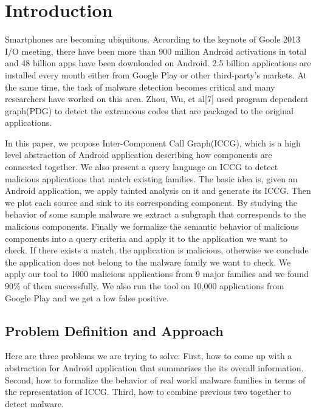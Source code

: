 \documentclass{sig-alternate}
\begin{document}
\section{Introduction}
Smartphones are becoming ubiquitous. According to the keynote of Goole 2013 I/O meeting, there have been more than 900 million Android activations in total and 48 billion apps have been downloaded on Android. 2.5 billion applications are installed every month either from Google Play or other third-party's markets.  At the same time, the task of malware detection becomes critical and many researchers have worked on this area. Zhou, Wu, et al[7] used program dependent graph(PDG) to detect the extraneous codes that are packaged to the original applications.

In this paper, we propose Inter-Component Call Graph(ICCG), which is a high level abstraction of Android application describing how components are connected together. We also present a query language on ICCG to detect malicious applications that match existing families.  The basic idea is, given an Android application, we apply tainted analysis on it and generate its ICCG.  Then we plot each source and sink to its corresponding component. By studying the behavior of  some sample malware we extract a subgraph that corresponds to the malicious components. Finally we formalize the semantic behavior of malicious components into a query criteria and apply it to the application we want to check. If there exists a match, the application is malicious, otherwise we conclude the application does not belong to the malware family we want to check. We apply our tool to 1000 malicious applications from 9 major families and we found 90\% of them successfully.  We also run the tool on 10,000 applications from Google Play and we get a low false positive.

\subsection{Problem Definition and Approach}
Here are three problems we are trying to solve: First, how to come up with a abstraction for Android application that summarizes the its overall information. Second, how to formalize the behavior of  real world malware families in terms of the representation of ICCG. Third, how to combine previous two  together to detect malware.
\end{document}
